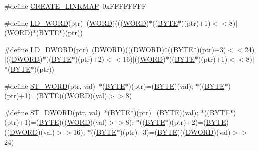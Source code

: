 \begin{DoxyCompactItemize}
\#define \hyperlink{ff_8h_aee297a9011164cf485a4df2a72758b08}{C\+R\+E\+A\+T\+E\+\_\+\+L\+I\+N\+K\+M\+A\+P}~0x\+F\+F\+F\+F\+F\+F\+F\+F
\item 
\#define \hyperlink{ff_8h_a398519bb08da6457e62567d1f0b567e3}{L\+D\+\_\+\+W\+O\+R\+D}(ptr)~(\hyperlink{integer_8h_a197942eefa7db30960ae396d68339b97}{W\+O\+R\+D})(((\hyperlink{integer_8h_a197942eefa7db30960ae396d68339b97}{W\+O\+R\+D})$\ast$((\hyperlink{integer_8h_a4ae1dab0fb4b072a66584546209e7d58}{B\+Y\+T\+E}$\ast$)(ptr)+1)$<$$<$8)$\vert$(\hyperlink{integer_8h_a197942eefa7db30960ae396d68339b97}{W\+O\+R\+D})$\ast$(\hyperlink{integer_8h_a4ae1dab0fb4b072a66584546209e7d58}{B\+Y\+T\+E}$\ast$)(ptr))
\item 
\#define \hyperlink{ff_8h_a4690304ddc975516f7dc02575c96e34e}{L\+D\+\_\+\+D\+W\+O\+R\+D}(ptr)~(\hyperlink{integer_8h_ad342ac907eb044443153a22f964bf0af}{D\+W\+O\+R\+D})(((\hyperlink{integer_8h_ad342ac907eb044443153a22f964bf0af}{D\+W\+O\+R\+D})$\ast$((\hyperlink{integer_8h_a4ae1dab0fb4b072a66584546209e7d58}{B\+Y\+T\+E}$\ast$)(ptr)+3)$<$$<$24)$\vert$((\hyperlink{integer_8h_ad342ac907eb044443153a22f964bf0af}{D\+W\+O\+R\+D})$\ast$((\hyperlink{integer_8h_a4ae1dab0fb4b072a66584546209e7d58}{B\+Y\+T\+E}$\ast$)(ptr)+2)$<$$<$16)$\vert$((\hyperlink{integer_8h_a197942eefa7db30960ae396d68339b97}{W\+O\+R\+D})$\ast$((\hyperlink{integer_8h_a4ae1dab0fb4b072a66584546209e7d58}{B\+Y\+T\+E}$\ast$)(ptr)+1)$<$$<$8)$\vert$$\ast$(\hyperlink{integer_8h_a4ae1dab0fb4b072a66584546209e7d58}{B\+Y\+T\+E}$\ast$)(ptr))
\item 
\#define \hyperlink{ff_8h_a95ceb4c25b216e71baa7102939edfd0d}{S\+T\+\_\+\+W\+O\+R\+D}(ptr,  val)~$\ast$(\hyperlink{integer_8h_a4ae1dab0fb4b072a66584546209e7d58}{B\+Y\+T\+E}$\ast$)(ptr)=(\hyperlink{integer_8h_a4ae1dab0fb4b072a66584546209e7d58}{B\+Y\+T\+E})(val); $\ast$((\hyperlink{integer_8h_a4ae1dab0fb4b072a66584546209e7d58}{B\+Y\+T\+E}$\ast$)(ptr)+1)=(\hyperlink{integer_8h_a4ae1dab0fb4b072a66584546209e7d58}{B\+Y\+T\+E})((\hyperlink{integer_8h_a197942eefa7db30960ae396d68339b97}{W\+O\+R\+D})(val)$>$$>$8)
\item 
\#define \hyperlink{ff_8h_abf5aba973d95ac5843b80aa7379cdd66}{S\+T\+\_\+\+D\+W\+O\+R\+D}(ptr,  val)~$\ast$(\hyperlink{integer_8h_a4ae1dab0fb4b072a66584546209e7d58}{B\+Y\+T\+E}$\ast$)(ptr)=(\hyperlink{integer_8h_a4ae1dab0fb4b072a66584546209e7d58}{B\+Y\+T\+E})(val); $\ast$((\hyperlink{integer_8h_a4ae1dab0fb4b072a66584546209e7d58}{B\+Y\+T\+E}$\ast$)(ptr)+1)=(\hyperlink{integer_8h_a4ae1dab0fb4b072a66584546209e7d58}{B\+Y\+T\+E})((\hyperlink{integer_8h_a197942eefa7db30960ae396d68339b97}{W\+O\+R\+D})(val)$>$$>$8); $\ast$((\hyperlink{integer_8h_a4ae1dab0fb4b072a66584546209e7d58}{B\+Y\+T\+E}$\ast$)(ptr)+2)=(\hyperlink{integer_8h_a4ae1dab0fb4b072a66584546209e7d58}{B\+Y\+T\+E})((\hyperlink{integer_8h_ad342ac907eb044443153a22f964bf0af}{D\+W\+O\+R\+D})(val)$>$$>$16); $\ast$((\hyperlink{integer_8h_a4ae1dab0fb4b072a66584546209e7d58}{B\+Y\+T\+E}$\ast$)(ptr)+3)=(\hyperlink{integer_8h_a4ae1dab0fb4b072a66584546209e7d58}{B\+Y\+T\+E})((\hyperlink{integer_8h_ad342ac907eb044443153a22f964bf0af}{D\+W\+O\+R\+D})(val)$>$$>$24)
\end{DoxyCompactItemize}
